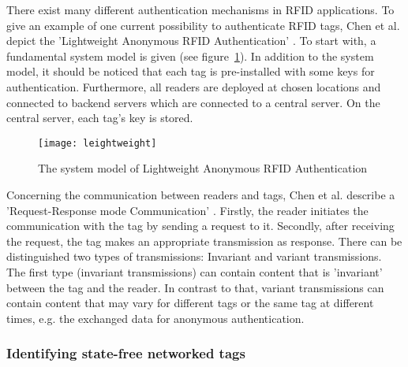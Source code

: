 There exist many different authentication mechanisms in RFID applications. To give an example of one current possibility to authenticate RFID tags, Chen et al. depict the 'Lightweight Anonymous RFID Authentication' \cite[p.39 ff.]{chen}. To start with, a fundamental system model is given (see figure~\ref{fig:lightweight}). In addition to the system model, it should be noticed that each tag is pre-installed with some keys for authentication. Furthermore, all readers are deployed at chosen locations and connected to backend servers which are connected to a central server. On the central server, each tag's key is stored.

\begin{figure}
\centering
\texttt{[image: leightweight]} 
\caption{\label{fig:lightweight} The system model of Lightweight Anonymous RFID Authentication \cite[p.40]{chen}} 
\end{figure}

Concerning the communication between readers and tags, Chen et al. describe a 'Request-Response mode Communication' \cite[p.40 ff.]{chen}. Firstly, the reader initiates the communication with the tag by sending a request to it. Secondly, after receiving the request, the tag makes an appropriate transmission as response. There can be distinguished two types of transmissions: Invariant and variant transmissions. The first type (invariant transmissions) can contain content that is 'invariant' between the tag and the reader. In contrast to that, variant transmissions can contain content that may vary for different tags or the same tag at different times, e.g. the exchanged data for anonymous authentication.  

\subsubsection{Identifying state-free networked tags}

